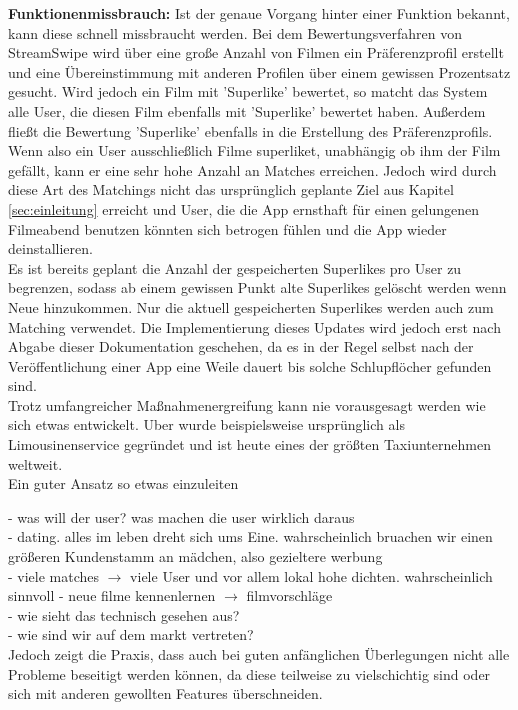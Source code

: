 \noindent
{}
\textbf{Funktionenmissbrauch:} Ist der genaue Vorgang hinter einer Funktion bekannt, kann diese schnell missbraucht werden. Bei dem Bewertungsverfahren von StreamSwipe wird über eine große Anzahl von Filmen ein Präferenzprofil erstellt und eine Übereinstimmung mit anderen Profilen über einem gewissen Prozentsatz gesucht. Wird jedoch ein Film mit 'Superlike' bewertet, so matcht das System alle User, die diesen Film ebenfalls mit 'Superlike' bewertet haben. Außerdem fließt die Bewertung 'Superlike' ebenfalls in die Erstellung des Präferenzprofils. Wenn also ein User ausschließlich Filme superliket, unabhängig ob ihm der Film gefällt, kann er eine sehr hohe Anzahl an Matches erreichen. Jedoch wird durch diese Art des Matchings nicht das ursprünglich geplante Ziel aus Kapitel \ref{sec:einleitung} erreicht und User, die die App ernsthaft für einen gelungenen Filmeabend benutzen könnten sich betrogen fühlen und die App wieder deinstallieren.\\
Es ist bereits geplant die Anzahl der gespeicherten Superlikes pro User zu begrenzen, sodass ab einem gewissen Punkt alte Superlikes gelöscht werden wenn Neue hinzukommen.  Nur die aktuell gespeicherten Superlikes werden auch zum Matching verwendet. Die Implementierung dieses Updates wird jedoch erst nach Abgabe dieser Dokumentation geschehen, da es in der Regel selbst nach der Veröffentlichung einer App eine Weile dauert bis solche Schlupflöcher gefunden sind.\\

\noindent
Trotz umfangreicher Maßnahmenergreifung kann nie vorausgesagt werden wie sich etwas entwickelt. Uber wurde beispielsweise ursprünglich als Limousinenservice gegründet und ist heute eines der größten Taxiunternehmen weltweit. \\
Ein guter Ansatz so etwas einzuleiten 

- was will der user? was machen die user wirklich daraus\\
\hspace{1cm} - dating. alles im leben dreht sich ums Eine. wahrscheinlich bruachen wir einen größeren Kundenstamm an mädchen, also gezieltere werbung\\
\hspace{1cm} - viele matches $\rightarrow$ viele User und vor allem lokal hohe dichten. wahrscheinlich sinnvoll
\hspace{1cm} - neue filme kennenlernen $\rightarrow$  filmvorschläge\\
- wie sieht das technisch gesehen aus?\\
- wie sind wir auf dem markt vertreten?\\


Jedoch zeigt die Praxis, dass auch bei guten anfänglichen Überlegungen nicht alle Probleme beseitigt werden können, da diese teilweise zu vielschichtig sind oder sich mit anderen gewollten Features überschneiden.